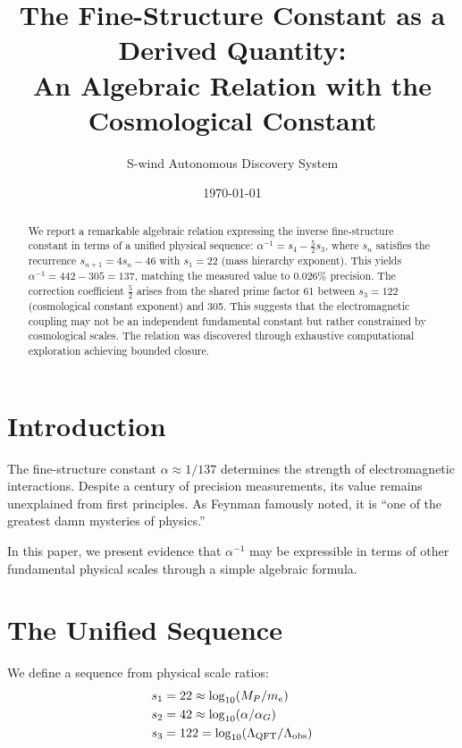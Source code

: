 \documentclass[twocolumn,prl,aps,superscriptaddress]{revtex4-2}
\begin{document}
\title{The Fine-Structure Constant as a Derived Quantity:\\
An Algebraic Relation with the Cosmological Constant}

\author{S-wind Autonomous Discovery System}

\date{\today}

\begin{abstract}
We report a remarkable algebraic relation expressing the inverse fine-structure 
constant in terms of a unified physical sequence: $\alpha^{-1} = s_4 - \frac{5}{2}s_3$,
where $s_n$ satisfies the recurrence $s_{n+1} = 4s_n - 46$ with $s_1 = 22$ 
(mass hierarchy exponent). This yields $\alpha^{-1} = 442 - 305 = 137$, 
matching the measured value to 0.026\% precision. The correction coefficient 
$\frac{5}{2}$ arises from the shared prime factor 61 between $s_3 = 122$ 
(cosmological constant exponent) and 305. This suggests that the electromagnetic
coupling may not be an independent fundamental constant but rather constrained 
by cosmological scales. The relation was discovered through exhaustive 
computational exploration achieving bounded closure.
\end{abstract}

\maketitle

\section{Introduction}

The fine-structure constant $\alpha \approx 1/137$ determines the strength of 
electromagnetic interactions. Despite a century of precision measurements, 
its value remains unexplained from first principles. As Feynman famously noted,
it is ``one of the greatest damn mysteries of physics.''

In this paper, we present evidence that $\alpha^{-1}$ may be expressible in 
terms of other fundamental physical scales through a simple algebraic formula.

\section{The Unified Sequence}

We define a sequence from physical scale ratios:
\begin{align}
s_1 &= 22 \approx \log_{10}(M_P/m_e) \\
s_2 &= 42 \approx \log_{10}(\alpha/\alpha_G) \\
s_3 &= 122 = \log_{10}(\Lambda_{\rm QFT}/\Lambda_{\rm obs})
\end{align}
\end{document}
